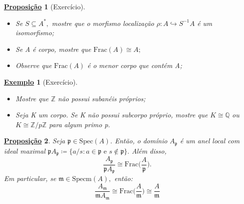 \documentclass{article}
\newtheorem*{prop*}{\underline{Proposi\c c\~ao}}
\newtheorem{example}{\underline{Exemplo}}
\begin{document}
\begin{prop*}[Exercício]
  \begin{itemize}
    \item[1)] Se \(S\subseteq A^{*},\) mostre que o morfismo localização \(\rho :A\hookrightarrow S^{-1}A\) é um isomorfismo;
    \item[2)] Se A é corpo, mostre que \(\mathrm{Frac}(A)\cong{A;}\)
    \item[3)] Observe que \(\mathrm{Frac}(A)\) é o menor corpo que contém A;
  \end{itemize}  
\end{prop*}
\begin{example}[Exercício]
  \begin{itemize}
    \item[1)] Mostre que \(\mathbb{Z}\) não possui subanéis próprios;
    \item[2)] Seja K um corpo. Se K não possui subcorpo próprio, mostre que \(K\cong{\mathbb{Q}}\) ou
      \(K\cong{\mathbb{Z}/p \mathbb{Z}}\) para algum primo p.
  \end{itemize}  
\end{example}
\begin{prop*}
  Seja \(\mathfrak{p}\in \mathrm{Spec}(A)\). Então, o domínio \(A_{\mathfrak{p}}\) é um anel local
  com ideal maximal \(\mathfrak{p}A_{\mathfrak{p}}\coloneqq \{a/s: a\in \mathfrak{p}\text{ e }s\not\in \mathfrak{p}\}.\) Além disso,
  \[
    \frac{A_{\mathfrak{p}}}{\mathfrak{p}A_{\mathfrak{p}}}\cong{\mathrm{Frac}\biggl(\frac{A}{\mathfrak{p}}\biggr).}
  \]
  Em particular, se \(\mathfrak{m}\in \mathrm{Specm}(A),\) então:
  \[
    \frac{A_{\mathfrak{m}}}{\mathfrak{m}A_{\mathfrak{m}}}\cong{\mathrm{Frac}\biggl(\frac{A}{\mathfrak{m}}\biggr)} \cong{\frac{A}{\mathfrak{m}}}
  \]
\end{prop*}
\end{document}
